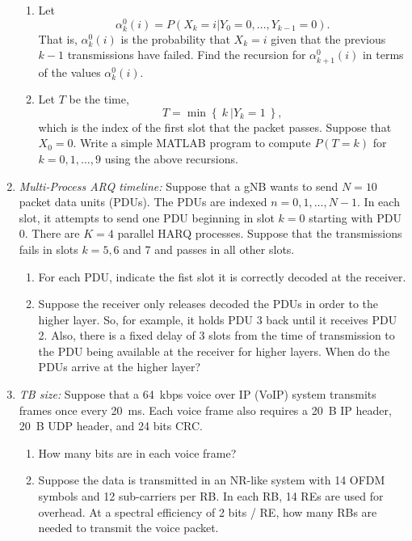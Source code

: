 \documentclass[11pt]{article}
\begin{document}
\begin{enumerate}
\begin{enumerate}[label=(\alph*)]
\item Let
\[
    \alpha^0_k(i) = P(X_k=i|Y_0=0,\ldots,Y_{k-1}=0).
\]
That is, $\alpha^0_k(i)$ is the probability that
$X_k=i$ given that the previous $k-1$ transmissions have failed.  Find the recursion for $\alpha^0_{k+1}(i)$ in
terms of the values $\alpha^0_k(i)$.

\item Let $T$ be the time,
\[
    T = \min \left\{~k~|Y_k = 1~\right\},
\]
which is the index of the first slot that the packet passes.
Suppose that $X_0=0$.
Write a simple MATLAB program to compute $P(T=k)$ for
$k=0,1,\ldots,9$ using the above recursions.
\end{enumerate}



\item \emph{Multi-Process ARQ timeline:} Suppose that a gNB wants to send $N=10$ packet data units
(PDUs).
The PDUs are indexed $n=0,1,\ldots,N-1$.
In each slot, it attempts to send one PDU beginning in slot $k=0$ starting with PDU 0.
There are  $K=4$ parallel HARQ processes.
Suppose that the transmissions fails in slots $k=5, 6$ and 7 and passes in all other slots.
\begin{enumerate}[label=(\alph*)]

\item For each PDU, indicate the fist slot it is correctly decoded at the receiver.

\item Suppose the receiver only releases decoded the PDUs in order to the higher layer.
So, for example, it holds PDU 3 back until it receives PDU 2.  Also, there is a fixed delay
of 3 slots from the time of transmission to the PDU being available at the receiver for higher layers.
When do the PDUs arrive at the higher layer?
\end{enumerate}



\item \emph{TB size:}  Suppose that a \SI{64}{kbps} voice over IP (VoIP)
system transmits frames once every
\SI{20}{ms}.  Each voice frame also requires a \SI{20}{B} IP header, \SI{20}{B} UDP header,
and 24 bits CRC.
\begin{enumerate}[label=(\alph*)]
\item How many bits are in each voice frame?

\item Suppose the data is transmitted in an NR-like system with 14 OFDM symbols and 12 sub-carriers
per RB.  In each RB, 14 REs are used for overhead.  At a spectral efficiency of 2 bits / RE,
how many RBs are needed to transmit the voice packet.


\end{enumerate}
\end{enumerate}
\end{document}
